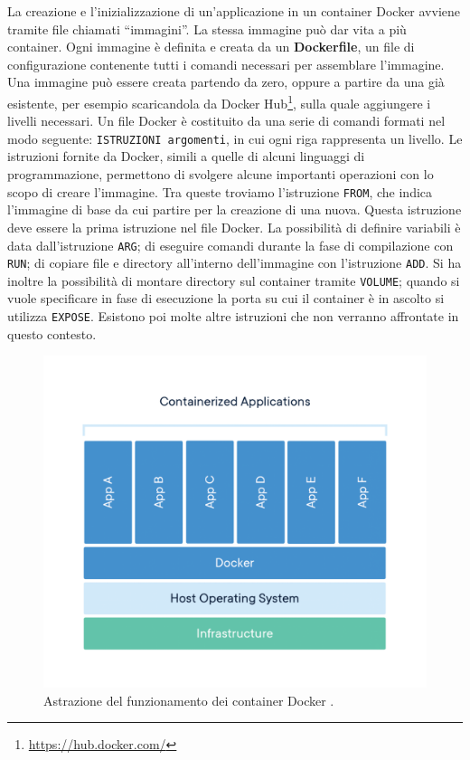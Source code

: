 \documentclass[italian, Lau, oneside, nodefaultfont, noexaminfo]{sapthesis}
\begin{document}
La creazione e l’inizializzazione  di un'applicazione in un container Docker avviene tramite file chiamati ``immagini''. La stessa immagine pu\`o dar vita a pi\`u container. Ogni immagine \`e definita e creata da un \textbf{Dockerfile}, un file di configurazione contenente tutti i comandi necessari  per assemblare l’immagine. Una immagine pu\`o essere creata  partendo da zero, oppure a partire  da una gi\`a esistente, per esempio scaricandola da Docker Hub\footnote{\url{https://hub.docker.com/}}, sulla quale aggiungere i livelli necessari.
Un file Docker \`e costituito da una serie di comandi formati nel modo seguente: \texttt{ISTRUZIONI   argomenti}, in cui ogni riga rappresenta un livello. Le istruzioni   fornite da Docker, simili a quelle di alcuni linguaggi di programmazione, permettono di svolgere alcune importanti operazioni con lo scopo di creare l'immagine.  Tra queste troviamo l'istruzione \texttt{FROM}, che indica l'immagine di base da cui partire per la creazione di una nuova. Questa istruzione deve essere la prima istruzione nel file Docker. La possibilit\`a di definire variabili è data dall'istruzione \texttt{ARG}; di eseguire comandi durante la fase di compilazione con \texttt{RUN}; di copiare file e directory all'interno dell'immagine con l'istruzione \texttt{ADD}. Si ha inoltre la possibilit\`a di montare directory sul container tramite \texttt{VOLUME}; quando si vuole specificare in fase di esecuzione la porta su cui il container \`e in ascolto  si utilizza \texttt{EXPOSE}. Esistono poi molte altre istruzioni che non  verranno affrontate in questo contesto.



\begin{figure}
    \centering
    \includegraphics[width=0.5 \textwidth]{figure/docker.png}
    \caption{Astrazione del funzionamento dei container Docker \protect \footnotemark .}
    \label{fig:docker}
\end{figure}

\end{document}
